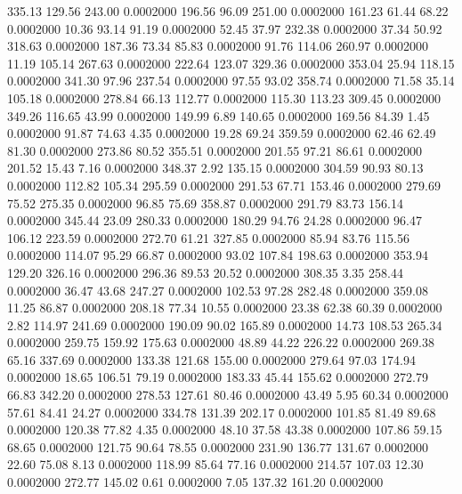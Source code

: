 335.13  129.56  243.00   0.0002000
 196.56   96.09  251.00   0.0002000
 161.23   61.44   68.22   0.0002000
  10.36   93.14   91.19   0.0002000
  52.45   37.97  232.38   0.0002000
  37.34   50.92  318.63   0.0002000
 187.36   73.34   85.83   0.0002000
  91.76  114.06  260.97   0.0002000
  11.19  105.14  267.63   0.0002000
 222.64  123.07  329.36   0.0002000
 353.04   25.94  118.15   0.0002000
 341.30   97.96  237.54   0.0002000
  97.55   93.02  358.74   0.0002000
  71.58   35.14  105.18   0.0002000
 278.84   66.13  112.77   0.0002000
 115.30  113.23  309.45   0.0002000
 349.26  116.65   43.99   0.0002000
 149.99    6.89  140.65   0.0002000
 169.56   84.39    1.45   0.0002000
  91.87   74.63    4.35   0.0002000
  19.28   69.24  359.59   0.0002000
  62.46   62.49   81.30   0.0002000
 273.86   80.52  355.51   0.0002000
 201.55   97.21   86.61   0.0002000
 201.52   15.43    7.16   0.0002000
 348.37    2.92  135.15   0.0002000
 304.59   90.93   80.13   0.0002000
 112.82  105.34  295.59   0.0002000
 291.53   67.71  153.46   0.0002000
 279.69   75.52  275.35   0.0002000
  96.85   75.69  358.87   0.0002000
 291.79   83.73  156.14   0.0002000
 345.44   23.09  280.33   0.0002000
 180.29   94.76   24.28   0.0002000
  96.47  106.12  223.59   0.0002000
 272.70   61.21  327.85   0.0002000
  85.94   83.76  115.56   0.0002000
 114.07   95.29   66.87   0.0002000
  93.02  107.84  198.63   0.0002000
 353.94  129.20  326.16   0.0002000
 296.36   89.53   20.52   0.0002000
 308.35    3.35  258.44   0.0002000
  36.47   43.68  247.27   0.0002000
 102.53   97.28  282.48   0.0002000
 359.08   11.25   86.87   0.0002000
 208.18   77.34   10.55   0.0002000
  23.38   62.38   60.39   0.0002000
   2.82  114.97  241.69   0.0002000
 190.09   90.02  165.89   0.0002000
  14.73  108.53  265.34   0.0002000
 259.75  159.92  175.63   0.0002000
  48.89   44.22  226.22   0.0002000
 269.38   65.16  337.69   0.0002000
 133.38  121.68  155.00   0.0002000
 279.64   97.03  174.94   0.0002000
  18.65  106.51   79.19   0.0002000
 183.33   45.44  155.62   0.0002000
 272.79   66.83  342.20   0.0002000
 278.53  127.61   80.46   0.0002000
  43.49    5.95   60.34   0.0002000
  57.61   84.41   24.27   0.0002000
 334.78  131.39  202.17   0.0002000
 101.85   81.49   89.68   0.0002000
 120.38   77.82    4.35   0.0002000
  48.10   37.58   43.38   0.0002000
 107.86   59.15   68.65   0.0002000
 121.75   90.64   78.55   0.0002000
 231.90  136.77  131.67   0.0002000
  22.60   75.08    8.13   0.0002000
 118.99   85.64   77.16   0.0002000
 214.57  107.03   12.30   0.0002000
 272.77  145.02    0.61   0.0002000
   7.05  137.32  161.20   0.0002000
